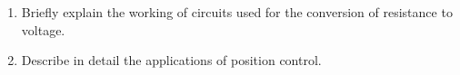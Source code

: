 \begin{procedure}
\end{procedure}
\newpage

\begin{reportq}
  \begin{enumerate}
    \item Briefly explain the working of circuits used for the conversion of resistance to voltage.
    \item Describe in detail the applications of position control.
  \end{enumerate}
\end{reportq}
